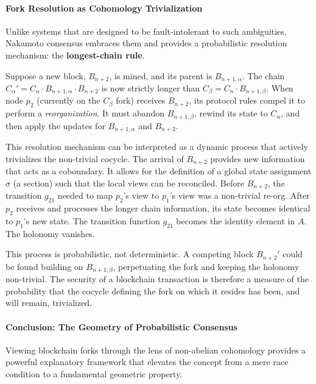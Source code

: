\documentclass[
]{article}
\begin{document}
\paragraph{Fork Resolution as Cohomology
Trivialization}\label{fork-resolution-as-cohomology-trivialization}

Unlike systems that are designed to be fault-intolerant to such
ambiguities, Nakamoto consensus embraces them and provides a
probabilistic resolution mechanism: the \textbf{longest-chain rule}.

Suppose a new block, \(B_{n+2}\), is mined, and its parent is
\(B_{n+1, \alpha}\). The chain
\(C_\alpha' = C_n \cdot B_{n+1, \alpha} \cdot B_{n+2}\) is now strictly
longer than \(C_\beta = C_n \cdot B_{n+1, \beta}\). When node \(p_2\)
(currently on the \(C_\beta\) fork) receives \(B_{n+2}\), its protocol
rules compel it to perform a \emph{reorganization}. It must abandon
\(B_{n+1, \beta}\), rewind its state to \(C_n\), and then apply the
updates for \(B_{n+1, \alpha}\) and \(B_{n+2}\).

This resolution mechanism can be interpreted as a dynamic process that
actively trivializes the non-trivial cocycle. The arrival of \(B_{n+2}\)
provides new information that acts as a coboundary. It allows for the
definition of a global state assignment \(\sigma\) (a section) such that
the local views can be reconciled. Before \(B_{n+2}\), the transition
\(g_{21}\) needed to map \(p_2\)'s view to \(p_1\)'s view was a
non-trivial re-org. After \(p_2\) receives and processes the longer
chain information, its state becomes identical to \(p_1\)'s new state.
The transition function \(g_{21}\) becomes the identity element in
\(A\). The holonomy vanishes.

This process is probabilistic, not deterministic. A competing block
\(B_{n+2}'\) could be found building on \(B_{n+1, \beta}\), perpetuating
the fork and keeping the holonomy non-trivial. The security of a
blockchain transaction is therefore a measure of the probability that
the cocycle defining the fork on which it resides has been, and will
remain, trivialized.

\paragraph{Conclusion: The Geometry of Probabilistic
Consensus}\label{conclusion-the-geometry-of-probabilistic-consensus}

Viewing blockchain forks through the lens of non-abelian cohomology
provides a powerful explanatory framework that elevates the concept from
a mere race condition to a fundamental geometric property.
\end{document}
